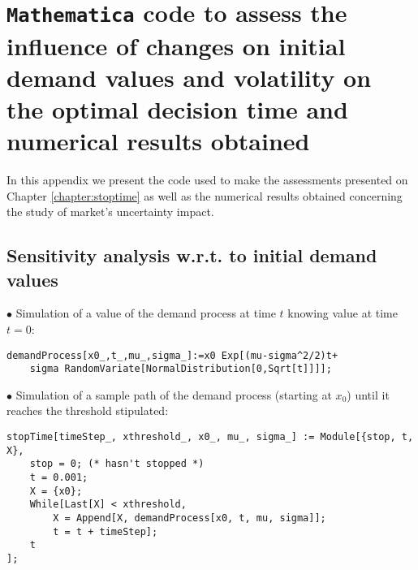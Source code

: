 
\chapter{\texttt{Mathematica} code to assess the influence of changes on initial demand values and volatility on the optimal decision time and numerical results obtained}
\label{chapter:appendixVectors}

In this appendix we present the code used to make the assessments presented on Chapter \ref{chapter:stoptime} as well as the numerical results obtained concerning the study of market's uncertainty impact.

\section{Sensitivity analysis w.r.t. to initial demand values}
	\label{section:saidv}


 $\bullet$ Simulation of a value of the demand process at time $t$ knowing value at time $t=0$:
\begin{lstlisting}
demandProcess[x0_,t_,mu_,sigma_]:=x0 Exp[(mu-sigma^2/2)t+
	sigma RandomVariate[NormalDistribution[0,Sqrt[t]]]];
\end{lstlisting}

\vspace{3mm}
$\bullet$ Simulation of a sample path of the demand process (starting at $x_0$) until it reaches the threshold stipulated:
\begin{lstlisting}
stopTime[timeStep_, xthreshold_, x0_, mu_, sigma_] := Module[{stop, t, X},
	stop = 0; (* hasn't stopped *)
	t = 0.001;
	X = {x0};
	While[Last[X] < xthreshold,
		X = Append[X, demandProcess[x0, t, mu, sigma]];
		t = t + timeStep];
	t
];
\end{lstlisting}


